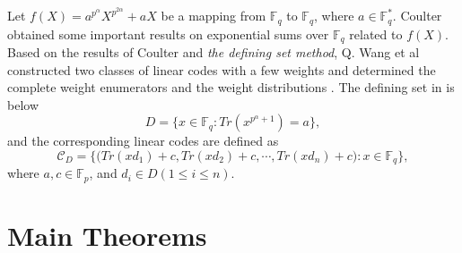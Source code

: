 \documentclass[final,1p,times]{elsarticle}
\begin{document}
Let $ f(X)=a^{p^{\alpha}}X^{p^{2\alpha}}+aX $ be a mapping from  $ \mathbb{F}_{q} $ to  $ \mathbb{F}_{q} $, where $ a\in   \mathbb{F}_{q}^{*}  $. 
Coulter \cite{Bib9,Bib10} obtained some important results on exponential sums over  $ \mathbb{F}_{q} $ related to $ f(X) $.
 Based on the results of Coulter  \cite{Bib9,Bib10} and  \textit{the defining set method}, Q. Wang et al constructed two classes of linear codes with a few weights and determined the complete weight enumerators and the weight distributions \cite{Bib8}.  The defining set in \cite{Bib8} is below
\begin{equation}\label{wang_definig_set}
D=\biggl\lbrace x\in \mathbb{F}_{q} : Tr(x^{p^{\alpha}+1})=a \biggr\rbrace,
\end{equation}
and the corresponding linear codes are defined as
\begin{equation}\label{wang_LD}
\mathcal{C}_{D}=\biggl\lbrace\bigl(Tr(xd_{1})+c,Tr(xd_{2})+c,\cdots,Tr(xd_{n})+c\bigr):x\in \mathbb{F}_{q} \biggr\rbrace,
\end{equation}
where $ a,c\in \mathbb{F}_{p} $, and $ d_{i}\in D  (1\leq i\leq n) $. 

 
 \section{Main Theorems} 
 
\end{document}
